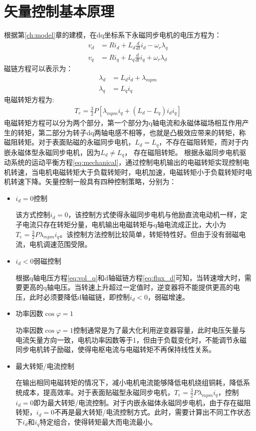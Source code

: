 \section{矢量控制基本原理}
根据第\ref{ch:model}章的建模，在dq坐标系下永磁同步电机的电压方程为：
\begin{align}\label{eq:vdqFinal}
v_{d}&=Ri_{d}+L_{d}\frac{d}{dt}i_{d}-\omega_{r}\lambda_{q}\\
v_{q}&=Ri_{q}+L_{q}\frac{d}{dt}i_{q}+\omega_{r}\lambda_{d}\label{eq:vol_q}
\end{align}
磁链方程可以表示为：
\begin{align}
\lambda_{d}&=L_{d}i_{d}+\lambda_{mpm}\label{eq:flux_d}\\
\lambda_{q}&=L_{q}i_{q}
\end{align}
电磁转矩方程为:
\begin{align}
T_{e}=\frac{3}{2}P\left[\lambda_{mpm}i_{q}+(L_{d}-L_{q})i_{d}i_{q}\right]
\end{align}
电磁转矩方程可以分为两个部分，第一个部分为q轴电流和永磁体磁场相互作用产生的转矩，第二部分为转子dq两轴电感不相等，也就是凸极效应带来的转矩，称磁阻转矩。对于表面贴磁的永磁同步电机，$L_{d}=L_{q}$，不存在磁阻转矩，而对于内嵌永磁体型永磁同步电机，因为$L_{d}$$\neq$$L_{q}$， 存在磁阻转矩。
根据永磁同步电机驱动系统的运动平衡方程\ref{eq:mechanical}，通过控制电机输出的电磁转矩实现控制电机转速，当电机电磁转矩大于负载转矩时，电机加速，电磁转矩小于负载转矩时电机转速下降。矢量控制一般具有四种控制策略，分别为：
\begin{itemize}
	\item $i_{d}=0$控制
	
该方式控制$i_{d}=0$，该控制方式使得永磁同步电机与他励直流电动机一样，定子电流只存在转矩分量，电机输出电磁转矩与q轴电流成正比，大小为$T_{e}=\frac{3}{2}P\lambda_{mpm}i_{q}$。该控制方法控制比较简单，转矩特性好。但由于没有弱磁电流，电机调速范围受限。
	\item $i_{d}<0$弱磁控制
	
根据q轴电压方程\ref{eq:vol_q}和d轴磁链方程\ref{eq:flux_d}可知，当转速增大时，需要更高的q轴电压。当转速上升超过一定值时，逆变器将不能提供更高的电压，此时必须要降低d轴磁链，即控制$i_{d}<0$，弱磁增速。
	\item 功率因数$\cos{\varphi}=1$
	
功率因数$\cos{\varphi}=1$控制通常是为了最大化利用逆变器容量，此时电压矢量与电流矢量方向一致，电机功率因数等于1，但由于负载变化时，不能调节永磁同步电机转子励磁，使得电枢电流与电磁转矩不再保持线性关系。
	\item 最大转矩/电流控制
	
在输出相同电磁转矩的情况下，减小电机电流能够降低电机绕组铜耗，降低系统成本，提高效率。对于表面贴磁型永磁同步电机，$T_{e}=\frac{3}{2}P\lambda_{mpm}i_{q}$，控制$i_{d}=0$即为最大转矩/电流控制。对于内嵌永磁体永磁同步电机，由于存在磁阻转矩，$i_{d}=0$不再是最大转矩/电流控制方式。此时，需要计算出不同工作状态下$i_{d}$和$i_{q}$特定组合，使得转矩最大而电流最小\cite{mtpa_2011,lee_mtpa_2010}。	
\end{itemize}

